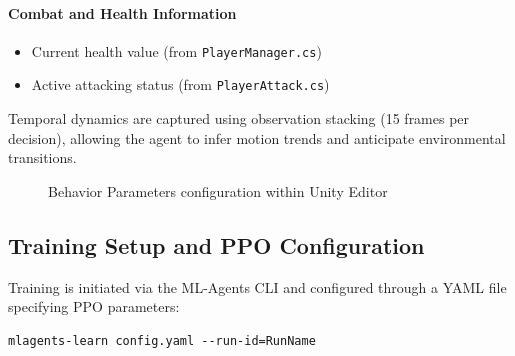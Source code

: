 \documentclass[12pt,oneside,openright,a4paper]{cpe-english-project}
\begin{document}
\paragraph{Combat and Health Information}
\begin{itemize}
\item Current health value (from \texttt{PlayerManager.cs})
\item Active attacking status (from \texttt{PlayerAttack.cs})
\end{itemize}

Temporal dynamics are captured using observation stacking (15 frames per decision), allowing the agent to infer motion trends and anticipate environmental transitions.

\begin{figure}[H]
\centering
{}
\caption{Behavior Parameters configuration within Unity Editor}\label{fig:BehaviorParameerInspector}
\end{figure}

\subsection{Training Setup and PPO Configuration}

Training is initiated via the ML-Agents CLI and configured through a YAML file specifying PPO parameters:

\begin{lstlisting}
mlagents-learn config.yaml --run-id=RunName
\end{lstlisting}
\end{document}
